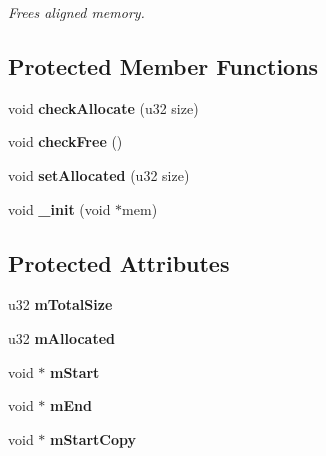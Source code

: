 \begin{DoxyCompactItemize}
\begin{DoxyCompactList}\small\item\em Frees aligned memory. \end{DoxyCompactList}\end{DoxyCompactItemize}
\subsection*{Protected Member Functions}
\begin{DoxyCompactItemize}
\item 
void {\bfseries check\+Allocate} (u32 size)\hypertarget{classDE_1_1Allocator_adfa4cc6e2a100ced016d76dad996ec03}{}\label{classDE_1_1Allocator_adfa4cc6e2a100ced016d76dad996ec03}

\item 
void {\bfseries check\+Free} ()\hypertarget{classDE_1_1Allocator_a77aa1061f03024b4908d1df48b5f6a9b}{}\label{classDE_1_1Allocator_a77aa1061f03024b4908d1df48b5f6a9b}

\item 
void {\bfseries set\+Allocated} (u32 size)\hypertarget{classDE_1_1Allocator_a1ba0de66726af5f264a32bbdc56e09e6}{}\label{classDE_1_1Allocator_a1ba0de66726af5f264a32bbdc56e09e6}

\item 
void {\bfseries \+\_\+init} (void $\ast$mem)\hypertarget{classDE_1_1Allocator_a26ac571c71cac6e35eaadef60b145d04}{}\label{classDE_1_1Allocator_a26ac571c71cac6e35eaadef60b145d04}

\end{DoxyCompactItemize}
\subsection*{Protected Attributes}
\begin{DoxyCompactItemize}
\item 
u32 {\bfseries m\+Total\+Size}\hypertarget{classDE_1_1Allocator_aceae0739788b604e09461cb87c9cee33}{}\label{classDE_1_1Allocator_aceae0739788b604e09461cb87c9cee33}

\item 
u32 {\bfseries m\+Allocated}\hypertarget{classDE_1_1Allocator_a5b5fdd9a1d11ae939f0dafee6aa65be7}{}\label{classDE_1_1Allocator_a5b5fdd9a1d11ae939f0dafee6aa65be7}

\item 
void $\ast$ {\bfseries m\+Start}\hypertarget{classDE_1_1Allocator_a4b8cbee3d0d9544e88ebdfaa62902b90}{}\label{classDE_1_1Allocator_a4b8cbee3d0d9544e88ebdfaa62902b90}

\item 
void $\ast$ {\bfseries m\+End}\hypertarget{classDE_1_1Allocator_adef4833178f44b6c047d47945d5c93d4}{}\label{classDE_1_1Allocator_adef4833178f44b6c047d47945d5c93d4}

\item 
void $\ast$ {\bfseries m\+Start\+Copy}\hypertarget{classDE_1_1Allocator_a26a25b124b6a727393ecaa51e8c9925b}{}\label{classDE_1_1Allocator_a26a25b124b6a727393ecaa51e8c9925b}

\end{DoxyCompactItemize}


